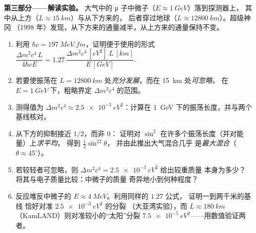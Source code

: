 \begin{problem}
\medskip\noindent\textbf{第三部分——解读实验。}
大气中的 μ 子中微子（$E \approx \qty{1}{GeV}$）落到探测器上，
其中从上方（$L \approx \qty{15}{km}$）与从下方来的，
后者穿过地球（$L \approx \qty{12800}{km}$）。超级神冈
（1998 年）发现，从下方来的通量减半，从上方来的通量保持不变。
\begin{enumerate}[resume]
  \item 利用 $\hbar c = \qty{197}{MeV.fm}$，证明便于使用的形式
        $\dfrac{\Delta m^2c^4\,L}{4\hbar cE} = 1.27\,
        \dfrac{\Delta m^2c^4\,[\unit{eV^2}]\ L\,[\unit{km}]}
        {E\,[\unit{GeV}]}$.
  \item 若要使振荡在 $L =
        \qty{12800}{km}$ 处\emph{充分发展}，而在 \qty{15}{km} 处\emph{可忽略}，
        在 $E = \qty{1}{GeV}$ 下，粗略界定 $\Delta m^2c^4$ 的范围。
  \item 测得值为 $\Delta m^2c^4 \approx
        \qty{2.5e-3}{eV^2}$：计算在
        \qty{1}{GeV} 下的振荡长度，并与两个基线核对。
  \item 从下方的抑制接近 $1/2$，而非 $0$：
        证明对 $\sin^2$ 在许多个振荡长度（并对能量）上\emph{求平均}，
        得到 $\tfrac12\sin^22\theta$，
        并由此推出大气混合几乎
        是\emph{最大混合}（$\theta \approx 45^\circ$）。
  \item 若较轻者可忽略，则 $\Delta m^2c^4 = \qty{2.5e-3}{eV^2}$ 给出较重质量
        本身为多少？
        将其与电子质量比较：中微子的质量
        奇异地小到何种程度？
  \item 反应堆反中微子的 $E \approx \qty{4}{MeV}$。利用同样的 $1.27$ 公式，
        证明一到两千米的基线
        恰好对准 $\qty{2.5e-3}{eV^2}$ 的分裂
        （大亚湾实验），而 $L \approx \qty{180}{km}$
        （KamLAND）则对准较小的“太阳”分裂
        $\qty{7.5e-5}{eV^2}$——用数值验证两者。
\end{enumerate}


\end{problem}
